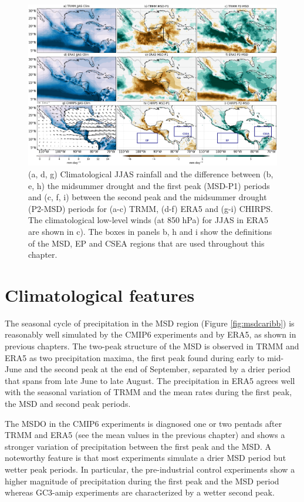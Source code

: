   \begin{figure}[b!]
\includegraphics[width=\linewidth]{figures/fig2obs_prdiff_2.png}
\caption[Observed composites of climatological and seasonal variations of precipitation.]{ (a, d, g) Climatological JJAS rainfall and the difference between  (b, e, h)  the midsummer drought and the first peak (MSD-P1) periods and (c, f, i)  between the second peak and the midsummer drought (P2-MSD) periods for (a-c) TRMM, (d-f) ERA5 and (g-i) CHIRPS. The climatological low-level winds (at 850 hPa) for JJAS in ERA5 are shown in c). The boxes in panels b, h and i show the definitions of the MSD, EP and CSEA regions that are used throughout this chapter.  }
\label{fig:eof2}
\end{figure} 

\section{Climatological features}

\label{sq:msdclim}

The seasonal cycle of precipitation in the MSD region (Figure \ref{fig:msdcaribb}) is reasonably well simulated by the CMIP6 experiments and by ERA5, as shown in previous chapters.
The two-peak structure of the MSD is observed in TRMM and ERA5 as two precipitation maxima, the first peak found during early to mid-June and the second peak at the end of September, separated by a drier period that spans from late June to late August. The precipitation in ERA5  agrees well with the seasonal variation of TRMM and the mean rates during the first peak, the MSD and second peak periods.

The MSDO in the CMIP6 experiments is diagnosed one or two pentads after TRMM and ERA5 (see the mean values in the previous chapter) and shows a stronger variation of precipitation between the first peak and the MSD. A noteworthy feature is that most experiments simulate a drier MSD period but wetter peak periods.
In particular, the pre-industrial control experiments show a higher magnitude of precipitation during the first peak and the MSD period whereas GC3-amip experiments are characterized by a wetter second peak. 

